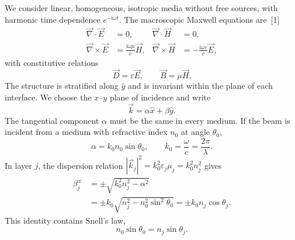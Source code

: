 \documentclass[10pt,a4paper]{article}
\newcommand{\ii}{\mathrm{i}}
\newcommand{\vE}{\vec{E}}
\newcommand{\vH}{\vec{H}}
\newcommand{\vk}{\vec{k}}
\begin{document}
We consider linear, homogeneous, isotropic media without free sources, with harmonic time dependence $e^{-\ii\omega t}$. The macroscopic Maxwell equations are~[1]
\begin{align}
\vec{\nabla}\cdot\vE&=0,
&\vec{\nabla}\cdot\vH&=0,\\
\vec{\nabla}\times\vE&=\frac{\ii\omega\mu}{c}\vH,
&\vec{\nabla}\times\vH&=-\frac{\ii\omega\varepsilon}{c}\vE,
\label{eq:maxwell}
\end{align}
with constitutive relations
\begin{equation}
\vec D=\varepsilon\vE,
\qquad
\vec B=\mu\vH.
\label{eq:constitutivas}
\end{equation}
The structure is stratified along $\hat y$ and is invariant within the plane of each interface. We choose the $x$--$y$ plane of incidence and write
\begin{equation}
\vk=\alpha\hat x+\beta\hat y.
\label{eq:k-vector}
\end{equation}
The tangential component $\alpha$ must be the same in every medium. If the beam is incident from a medium with refractive index $n_0$ at angle $\theta_0$,
\begin{equation}
\alpha=k_0n_0\sin\theta_0,
\qquad
k_0=\frac{\omega}{c}=\frac{2\pi}{\lambda}.
\label{eq:alpha}
\end{equation}
In layer $j$, the dispersion relation $|\vk_j|^2=k_0^2\varepsilon_j\mu_j=k_0^2n_j^2$ gives
\begin{align}
\beta_j^{\pm}
&=\pm\sqrt{k_0^2n_j^2-\alpha^2}\\
&=\pm k_0\sqrt{n_j^2-n_0^2\sin^2\theta_0}
=\pm k_0n_j\cos\theta_j.
\label{eq:beta}
\end{align}
This identity contains Snell's law,
\begin{equation}
n_0\sin\theta_0=n_j\sin\theta_j.
\label{eq:snell}
\end{equation}
\end{document}
